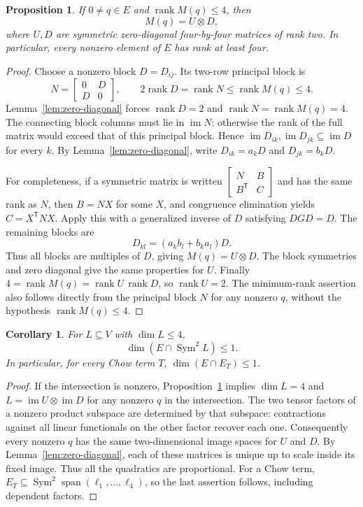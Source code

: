 \documentclass[11pt]{article}
\newtheorem{proposition}[theorem]{Proposition}
\newtheorem{corollary}[theorem]{Corollary}
\theoremstyle{remark}
\newcommand{\Sym}{\operatorname{Sym}}
\newcommand{\Span}{\operatorname{span}}
\newcommand{\rank}{\operatorname{rank}}
\newcommand{\im}{\operatorname{im}}
\begin{document}
\begin{proposition}\label{prop:lowrank}
If $0\ne q\in E$ and $\rank M(q)\leq4$, then
\[
 M(q)=U\otimes D,
\]
where $U,D$ are symmetric zero-diagonal four-by-four matrices of rank two.
In particular, every nonzero element of $E$ has rank at least four.
\end{proposition}
\begin{proof}
Choose a nonzero block $D=D_{ij}$. Its two-row principal block is
\[
 N=\begin{bmatrix}0&D\\D&0\end{bmatrix},\qquad
 2\rank D=\rank N\leq\rank M(q)\leq4.
\]
Lemma~\ref{lem:zero-diagonal} forces $\rank D=2$ and
$\rank N=\rank M(q)=4$. The connecting block columns must lie in
$\im N$: otherwise the rank of the full matrix would exceed that of this
principal block. Hence
$\im D_{ik},\im D_{jk}\subseteq\im D$ for every $k$.
By Lemma~\ref{lem:zero-diagonal}, write
$D_{ik}=a_kD$ and $D_{jk}=b_kD$.

For completeness, if a symmetric matrix is written
$\left[\begin{smallmatrix}N&B\\B^{\mathsf T}&C\end{smallmatrix}\right]$
and has the same rank as $N$, then $B=NX$ for some $X$, and congruence
elimination yields $C=X^{\mathsf T}NX$. Apply this with a generalized
inverse of $D$ satisfying $DGD=D$. The remaining blocks are
\[
 D_{kl}=(a_kb_l+b_ka_l)D.
\]
Thus all blocks are multiples of $D$, giving $M(q)=U\otimes D$.
The block symmetries and zero diagonal give the same properties for $U$.
Finally $4=\rank M(q)=\rank U\,\rank D$, so $\rank U=2$.
The minimum-rank assertion also follows directly from the principal block
$N$ for any nonzero $q$, without the hypothesis $\rank M(q)\leq4$.
\end{proof}

\begin{corollary}\label{cor:intersection}
For $L\subseteq V$ with $\dim L\leq4$,
\[
 \dim(E\cap\Sym^2L)\leq1.
\]
In particular, for every Chow term $T$, $\dim(E\cap E_T)\leq1$.
\end{corollary}
\begin{proof}
If the intersection is nonzero, Proposition~\ref{prop:lowrank} implies
$\dim L=4$ and
$L=\im U\otimes\im D$ for any nonzero $q$ in the intersection.
The two tensor factors of a nonzero product subspace are determined by
that subspace: contractions against all linear functionals on the other
factor recover each one. Consequently every nonzero $q$ has the same
two-dimensional image spaces for $U$ and $D$. By
Lemma~\ref{lem:zero-diagonal}, each of these matrices is unique up to
scale inside its fixed image. Thus all the quadratics are proportional.
For a Chow term, $E_T\subseteq\Sym^2\Span(\ell_1,\ldots,\ell_4)$,
so the last assertion follows, including dependent factors.
\end{proof}
\end{document}
